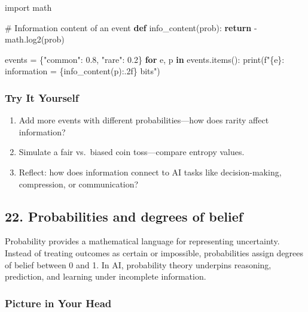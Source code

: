 \documentclass[
  letterpaper,
  DIV=11,
  numbers=noendperiod]{scrreprt}
\newenvironment{Shaded}{\begin{snugshade}}{\end{snugshade}}
\newcommand{\BuiltInTok}[1]{\textcolor[rgb]{0.00,0.23,0.31}{#1}}
\newcommand{\CommentTok}[1]{\textcolor[rgb]{0.37,0.37,0.37}{#1}}
\newcommand{\ControlFlowTok}[1]{\textcolor[rgb]{0.00,0.23,0.31}{\textbf{#1}}}
\newcommand{\FloatTok}[1]{\textcolor[rgb]{0.68,0.00,0.00}{#1}}
\newcommand{\ImportTok}[1]{\textcolor[rgb]{0.00,0.46,0.62}{#1}}
\newcommand{\KeywordTok}[1]{\textcolor[rgb]{0.00,0.23,0.31}{\textbf{#1}}}
\newcommand{\NormalTok}[1]{\textcolor[rgb]{0.00,0.23,0.31}{#1}}
\newcommand{\OperatorTok}[1]{\textcolor[rgb]{0.37,0.37,0.37}{#1}}
\newcommand{\SpecialCharTok}[1]{\textcolor[rgb]{0.37,0.37,0.37}{#1}}
\newcommand{\SpecialStringTok}[1]{\textcolor[rgb]{0.13,0.47,0.30}{#1}}
\newcommand{\StringTok}[1]{\textcolor[rgb]{0.13,0.47,0.30}{#1}}
\providecommand{\tightlist}{%
  \setlength{\itemsep}{0pt}\setlength{\parskip}{0pt}}
\begin{document}
\begin{Shaded}
\begin{Highlighting}[]
\ImportTok{import}\NormalTok{ math}

\CommentTok{\# Information content of an event}
\KeywordTok{def}\NormalTok{ info\_content(prob):}
    \ControlFlowTok{return} \OperatorTok{{-}}\NormalTok{math.log2(prob)}

\NormalTok{events }\OperatorTok{=}\NormalTok{ \{}\StringTok{"common"}\NormalTok{: }\FloatTok{0.8}\NormalTok{, }\StringTok{"rare"}\NormalTok{: }\FloatTok{0.2}\NormalTok{\}}
\ControlFlowTok{for}\NormalTok{ e, p }\KeywordTok{in}\NormalTok{ events.items():}
    \BuiltInTok{print}\NormalTok{(}\SpecialStringTok{f"}\SpecialCharTok{\{}\NormalTok{e}\SpecialCharTok{\}}\SpecialStringTok{: information = }\SpecialCharTok{\{}\NormalTok{info\_content(p)}\SpecialCharTok{:.2f\}}\SpecialStringTok{ bits"}\NormalTok{)}
\end{Highlighting}
\end{Shaded}

\subsubsection{Try It Yourself}\label{try-it-yourself-20}

\begin{enumerate}
\def\labelenumi{\arabic{enumi}.}
\tightlist
\item
  Add more events with different probabilities---how does rarity affect
  information?
\item
  Simulate a fair vs.~biased coin toss---compare entropy values.
\item
  Reflect: how does information connect to AI tasks like
  decision-making, compression, or communication?
\end{enumerate}

\subsection{22. Probabilities and degrees of
belief}\label{probabilities-and-degrees-of-belief}

Probability provides a mathematical language for representing
uncertainty. Instead of treating outcomes as certain or impossible,
probabilities assign degrees of belief between 0 and 1. In AI,
probability theory underpins reasoning, prediction, and learning under
incomplete information.

\subsubsection{Picture in Your Head}\label{picture-in-your-head-21}
\end{document}
